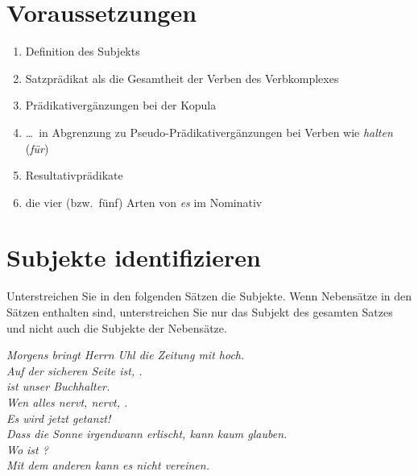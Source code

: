 \section*{Voraussetzungen}

\begin{enumerate}\Lf
  \item Definition des Subjekts
  \item Satzprädikat als die Gesamtheit der Verben des Verbkomplexes
  \item Prädikativergänzungen bei der Kopula
  \item \ldots\ in Abgrenzung zu Pseudo-Prädikativergänzungen bei Verben wie \textit{halten} (\textit{für})
  \item Resultativprädikate
  \item die vier (bzw.\ fünf) Arten von \textit{es} im Nominativ
\end{enumerate}

\section{Subjekte identifizieren}\label{sec:subjekte}

Unterstreichen Sie in den folgenden Sätzen die Subjekte.
Wenn Nebensätze in den Sätzen enthalten sind, unterstreichen Sie nur das Subjekt des gesamten Satzes und nicht auch die Subjekte der Nebensätze.

\begin{exe}
  \ex \textit{Morgens bringt  Herrn Uhl die Zeitung mit hoch.} \\
  \Viertelzeile
  \ex \textit{Auf der sicheren Seite ist, .} \\
  \Viertelzeile
  \ex \textit{ ist unser Buchhalter.} \\
  \Viertelzeile
  \ex \textit{Wen alles nervt, nervt, .} \\
  \Viertelzeile
  \ex \textit{Es wird jetzt getanzt!} \\
  \Viertelzeile
  \ex \textit{Dass die Sonne irgendwann erlischt, kann  kaum glauben.} \\
  \Viertelzeile
  \ex \textit{Wo ist ?} \\
  \Viertelzeile
  \ex \textit{Mit dem anderen kann  es nicht vereinen.} \\
  \Viertelzeile
\end{exe}

